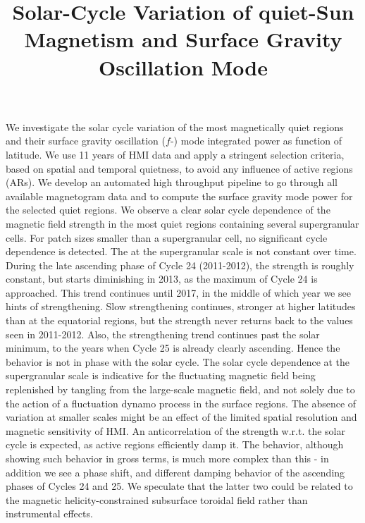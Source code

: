 \documentclass{aa}
\begin{document}
\title{Solar-Cycle Variation of quiet-Sun Magnetism and Surface Gravity Oscillation Mode}



{We investigate the solar cycle variation of the most magnetically quiet regions and
their surface gravity oscillation ($f$-) mode integrated power as function of latitude.}
{We use 11 years of HMI data and apply a stringent selection criteria, based on
spatial and temporal quietness, to avoid any influence of active regions (ARs).
We develop an automated high throughput pipeline to go through all available magnetogram data
and to compute the surface gravity mode power for the selected quiet regions.}
{We observe a clear solar cycle dependence of the magnetic field strength in the most
quiet regions containing several supergranular cells. For patch sizes smaller than a supergranular
cell, no significant cycle dependence is detected. The \fff at the supergranular scale 
is not constant over time.
During the late ascending phase of Cycle 24 (2011-2012), the \fff strength is roughly constant, but starts diminishing in 2013, as the maximum of Cycle 24 is approached. This trend continues
until 2017, in the middle of which year we see hints of strengthening.
Slow strengthening continues, stronger at higher latitudes than at the equatorial regions, but the \fff strength never returns back to the values seen in 2011-2012. Also, the strengthening trend continues past the solar minimum, to the years when Cycle 25 is already clearly ascending. Hence the \fff behavior is not in phase with the solar cycle. 
}
{The solar cycle dependence at the supergranular scale is indicative for the fluctuating magnetic
field being replenished by tangling from the large-scale magnetic field, and not solely due to
the action of a fluctuation dynamo process in the surface regions. 
The absence of variation at smaller scales might be an effect of the
limited spatial resolution and magnetic sensitivity of HMI.
An anticorrelation of the \fff strength w.r.t. the solar cycle is expected, as active regions efficiently damp it. The \fff behavior, although showing such behavior in gross terms, is much more complex than this - in addition we see a phase shift, and different damping behavior of the ascending phases of Cycles 24 and 25. We speculate that the latter two could be related to the magnetic helicity-constrained subsurface toroidal field rather than instrumental effects. 
}
\end{document}
